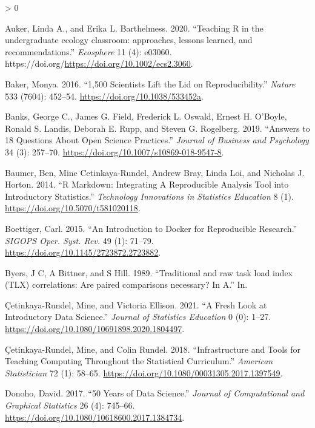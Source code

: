 \documentclass[
]{article}
\newlength{\cslhangindent}
\newenvironment{CSLReferences}[2] %
 {%
  \setlength{\parindent}{0pt}
  \ifodd #1 \everypar{\setlength{\hangindent}{\cslhangindent}}\ignorespaces\fi
  \ifnum #2 > 0
  \setlength{\parskip}{#2\baselineskip}
  \fi
 }%
 {}
\begin{document}
\hypertarget{refs}{}
\begin{CSLReferences}{1}{0}
\leavevmode\hypertarget{ref-Auker2020}{}%
Auker, Linda A., and Erika L. Barthelmess. 2020. {``{Teaching R in the
undergraduate ecology classroom: approaches, lessons learned, and
recommendations}.''} \emph{Ecosphere} 11 (4): e03060.
https://doi.org/\url{https://doi.org/10.1002/ecs2.3060}.

\leavevmode\hypertarget{ref-Baker2016}{}%
Baker, Monya. 2016. {``1,500 Scientists Lift the Lid on
Reproducibility.''} \emph{Nature} 533 (7604): 452--54.
\url{https://doi.org/10.1038/533452a}.

\leavevmode\hypertarget{ref-Banks2019}{}%
Banks, George C., James G. Field, Frederick L. Oswald, Ernest H.
O'Boyle, Ronald S. Landis, Deborah E. Rupp, and Steven G. Rogelberg.
2019. {``{Answers to 18 Questions About Open Science Practices}.''}
\emph{Journal of Business and Psychology} 34 (3): 257--70.
\url{https://doi.org/10.1007/s10869-018-9547-8}.

\leavevmode\hypertarget{ref-Baumer2014}{}%
Baumer, Ben, Mine Cetinkaya-Rundel, Andrew Bray, Linda Loi, and Nicholas
J. Horton. 2014. {``{R Markdown: Integrating A Reproducible Analysis
Tool into Introductory Statistics}.''} \emph{Technology Innovations in
Statistics Education} 8 (1). \url{https://doi.org/10.5070/t581020118}.

\leavevmode\hypertarget{ref-Boettiger2015}{}%
Boettiger, Carl. 2015. {``{An Introduction to Docker for Reproducible
Research}.''} \emph{SIGOPS Oper. Syst. Rev.} 49 (1): 71--79.
\url{https://doi.org/10.1145/2723872.2723882}.

\leavevmode\hypertarget{ref-Byers1989}{}%
Byers, J C, A Bittner, and S Hill. 1989. {``{Traditional and raw task
load index (TLX) correlations: Are paired comparisons necessary? In
A}.''} In.

\leavevmode\hypertarget{ref-Cetinkaya-Rundel2021}{}%
Çetinkaya-Rundel, Mine, and Victoria Ellison. 2021. {``{A Fresh Look at
Introductory Data Science}.''} \emph{Journal of Statistics Education} 0
(0): 1--27. \url{https://doi.org/10.1080/10691898.2020.1804497}.

\leavevmode\hypertarget{ref-Cetinkaya-Rundel2018}{}%
Çetinkaya-Rundel, Mine, and Colin Rundel. 2018. {``{Infrastructure and
Tools for Teaching Computing Throughout the Statistical Curriculum}.''}
\emph{American Statistician} 72 (1): 58--65.
\url{https://doi.org/10.1080/00031305.2017.1397549}.

\leavevmode\hypertarget{ref-Donoho2017}{}%
Donoho, David. 2017. {``{50 Years of Data Science}.''} \emph{Journal of
Computational and Graphical Statistics} 26 (4): 745--66.
\url{https://doi.org/10.1080/10618600.2017.1384734}.


\end{CSLReferences}
\end{document}
